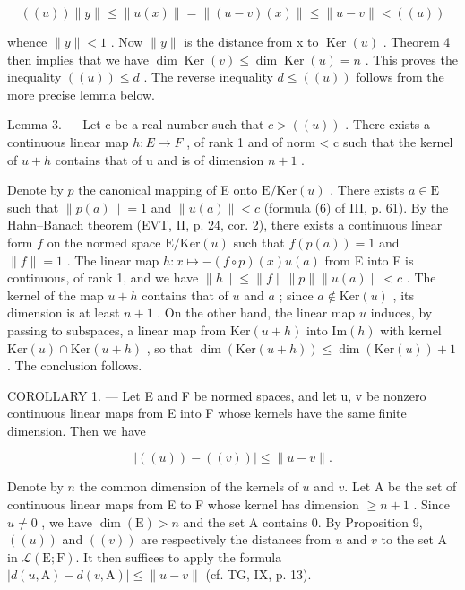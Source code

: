 \[
((u)) \| y \| \leqslant \| u (x) \| = \| (u - v) (x) \| \leqslant \| u - v \| <   ((u))
\]

whence \(\|y\| < 1\) . Now \(\|y\|\) is the distance from x to \(\operatorname{Ker}(u)\) . Theorem 4 then implies that we have \(\dim \operatorname{Ker}(v) \leqslant \dim \operatorname{Ker}(u) = n\) . This proves the inequality \(((u)) \leqslant d\) . The reverse inequality \(d \leqslant ((u))\) follows from the more precise lemma below.

Lemma 3. — Let c be a real number such that \(c > ((u))\) . There exists a continuous linear map \(h: E \to F\) , of rank 1 and of norm \textless{} c such that the kernel of \(u + h\) contains that of u and is of dimension \(n + 1\) .

Denote by \(p\) the canonical mapping of E onto \(\mathrm{E} / \mathrm{Ker}(u)\) . There exists \(a \in \mathrm{E}\) such that \(\| p(a) \| = 1\) and \(\| u(a) \| < c\) (formula (6) of III, p. 61). By the Hahn--Banach theorem (EVT, II, p. 24, cor. 2), there exists a continuous linear form \(f\) on the normed space \(\mathrm{E} / \mathrm{Ker}(u)\) such that \(f(p(a)) = 1\) and \(\| f \| = 1\) . The linear map \(h: x \mapsto -(f \circ p)(x)u(a)\) from E into F is continuous, of rank 1, and we have \(\| h \| \leqslant \| f \| \| p \| \| u(a) \| < c\) . The kernel of the map \(u + h\) contains that of \(u\) and \(a\) ; since \(a \notin \mathrm{Ker}(u)\) , its dimension is at least \(n + 1\) . On the other hand, the linear map \(u\) induces, by passing to subspaces, a linear map from \(\mathrm{Ker}(u + h)\) into \(\mathrm{Im}(h)\) with kernel \(\mathrm{Ker}(u) \cap \mathrm{Ker}(u + h)\) , so that \(\dim(\mathrm{Ker}(u + h)) \leqslant \dim(\mathrm{Ker}(u)) + 1\) . The conclusion follows.

COROLLARY 1. --- Let E and F be normed spaces, and let u, v be nonzero continuous linear maps from E into F whose kernels have the same finite dimension. Then we have

\[
\left| \left((u)\right) - ((v)) \right| \leqslant \| u - v \|.
\]

Denote by \(n\) the common dimension of the kernels of \(u\) and \(v\). Let A be the set of continuous linear maps from E to F whose kernel has dimension \(\geqslant n + 1\) . Since \(u \neq 0\) , we have \(\dim(\mathrm{E}) > n\) and the set A contains 0. By Proposition 9, \(((u))\) and \(((v))\) are respectively the distances from \(u\) and \(v\) to the set A in \(\mathcal{L}(\mathrm{E};\mathrm{F})\). It then suffices to apply the formula \(|d(u,\mathrm{A}) - d(v,\mathrm{A})| \leqslant \|u - v\|\) (cf. TG, IX, p. 13).

